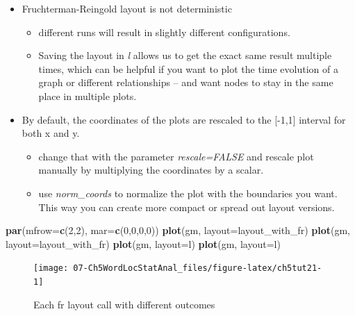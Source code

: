 \documentclass[
]{article}
\newenvironment{Shaded}{\begin{snugshade}}{\end{snugshade}}
\newcommand{\AttributeTok}[1]{\textcolor[rgb]{0.13,0.29,0.53}{#1}}
\newcommand{\DecValTok}[1]{\textcolor[rgb]{0.00,0.00,0.81}{#1}}
\newcommand{\FunctionTok}[1]{\textcolor[rgb]{0.13,0.29,0.53}{\textbf{#1}}}
\newcommand{\NormalTok}[1]{#1}
\providecommand{\tightlist}{%
  \setlength{\itemsep}{0pt}\setlength{\parskip}{0pt}}
\begin{document}
\begin{itemize}
\tightlist
\item
  Fruchterman-Reingold layout is not deterministic

  \begin{itemize}
  \tightlist
  \item
    different runs will result in slightly different configurations.
  \item
    Saving the layout in \emph{l} allows us to get the exact same result multiple times, which can be helpful if you want to plot the time evolution of a graph or different relationships -- and want nodes to stay in the same place in multiple plots.
  \end{itemize}
\item
  By default, the coordinates of the plots are rescaled to the {[}-1,1{]} interval for both x and y.

  \begin{itemize}
  \tightlist
  \item
    change that with the parameter \emph{rescale=FALSE} and rescale plot manually by multiplying the coordinates by a scalar.
  \item
    use \emph{norm\_coords} to normalize the plot with the boundaries you want. This way you can create more compact or spread out layout versions.
  \end{itemize}
\end{itemize}

\begin{Shaded}
\begin{Highlighting}[]
\FunctionTok{par}\NormalTok{(}\AttributeTok{mfrow=}\FunctionTok{c}\NormalTok{(}\DecValTok{2}\NormalTok{,}\DecValTok{2}\NormalTok{), }\AttributeTok{mar=}\FunctionTok{c}\NormalTok{(}\DecValTok{0}\NormalTok{,}\DecValTok{0}\NormalTok{,}\DecValTok{0}\NormalTok{,}\DecValTok{0}\NormalTok{))}
\FunctionTok{plot}\NormalTok{(gm, }\AttributeTok{layout=}\NormalTok{layout\_with\_fr)}
\FunctionTok{plot}\NormalTok{(gm, }\AttributeTok{layout=}\NormalTok{layout\_with\_fr)}
\FunctionTok{plot}\NormalTok{(gm, }\AttributeTok{layout=}\NormalTok{l)}
\FunctionTok{plot}\NormalTok{(gm, }\AttributeTok{layout=}\NormalTok{l)}
\end{Highlighting}
\end{Shaded}

\begin{figure}

{\centering \texttt{[image: 07-Ch5WordLocStatAnal\_files/figure-latex/ch5tut21-1]} 

}

\caption{Each fr layout call with different outcomes}\label{fig:ch5tut21}
\end{figure}
\end{document}
